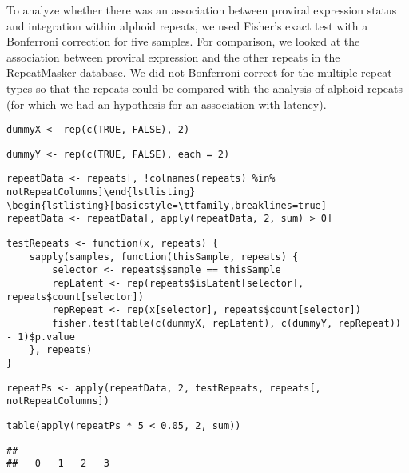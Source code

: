 \documentclass[../../sherrill-Mix_thesis.tex]{subfiles}
\makeatletter
\newenvironment{kframe}{%
 \def\at@end@of@kframe{}%
 \ifinner\ifhmode%
  \def\at@end@of@kframe{\end{minipage}}%
  \begin{minipage}{\columnwidth}%
 \fi\fi%
 \def\FrameCommand##1{\hskip\@totalleftmargin \hskip-\fboxsep
 \colorbox{shadecolor}{##1}\hskip-\fboxsep
     \hskip-\linewidth \hskip-\@totalleftmargin \hskip\columnwidth}%
 \MakeFramed {\advance\hsize-\width
   \@totalleftmargin\z@ \linewidth\hsize
   \@setminipage}}%
 {\par\unskip\endMakeFramed%
 \at@end@of@kframe}
\newenvironment{knitrout}{}{} %
\makeatother
\begin{document}
To analyze whether there was an association between proviral expression status and integration within alphoid repeats, we used Fisher's exact test with a Bonferroni correction for five samples. For comparison, we looked at the association between proviral expression and the other repeats in the RepeatMasker database. We did not Bonferroni correct for the multiple repeat types so that the repeats could be compared with the analysis of alphoid repeats (for which we had an  hypothesis for an association with latency).
\begin{knitrout}
\color{fgcolor}\begin{kframe}
\begin{lstlisting}[basicstyle=\ttfamily,breaklines=true]
dummyX <- rep(c(TRUE, FALSE), 2)\end{lstlisting}
\begin{lstlisting}[basicstyle=\ttfamily,breaklines=true]
dummyY <- rep(c(TRUE, FALSE), each = 2)\end{lstlisting}
\begin{lstlisting}[basicstyle=\ttfamily,breaklines=true]
repeatData <- repeats[, !colnames(repeats) %in% notRepeatColumns]\end{lstlisting}
\begin{lstlisting}[basicstyle=\ttfamily,breaklines=true]
repeatData <- repeatData[, apply(repeatData, 2, sum) > 0]\end{lstlisting}
\begin{lstlisting}[basicstyle=\ttfamily,breaklines=true]
testRepeats <- function(x, repeats) {
    sapply(samples, function(thisSample, repeats) {
        selector <- repeats$sample == thisSample
        repLatent <- rep(repeats$isLatent[selector], repeats$count[selector])
        repRepeat <- rep(x[selector], repeats$count[selector])
        fisher.test(table(c(dummyX, repLatent), c(dummyY, repRepeat)) - 1)$p.value
    }, repeats)
}\end{lstlisting}
\begin{lstlisting}[basicstyle=\ttfamily,breaklines=true]
repeatPs <- apply(repeatData, 2, testRepeats, repeats[, notRepeatColumns])\end{lstlisting}
\begin{lstlisting}[basicstyle=\ttfamily,breaklines=true]
table(apply(repeatPs * 5 < 0.05, 2, sum))\end{lstlisting}
\begin{lstlisting}[basicstyle=\ttfamily,breaklines=true]
## 
##   0   1   2   3 

\end{lstlisting}
\end{kframe}
\end{knitrout}
\end{document}
